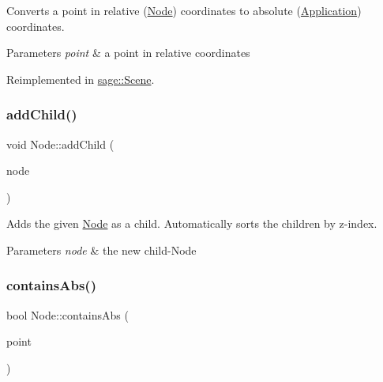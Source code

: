 Converts a point in relative (\mbox{\hyperlink{classsage_1_1Node}{Node}}) coordinates to absolute (\mbox{\hyperlink{classsage_1_1Application}{Application}}) coordinates. 


\begin{DoxyParams}{Parameters}
{\em point} & a point in relative coordinates \\
\hline
\end{DoxyParams}


Reimplemented in \mbox{\hyperlink{classsage_1_1Scene_a97d7d623cc44062249a199c63c67b5be}{sage\+::\+Scene}}.

\mbox{\label{classsage_1_1Node_ae7bf832d6fd80f69a244ae3dad7b3fb4}} 
\subsubsection{\texorpdfstring{addChild()}{addChild()}}
{\footnotesize\ttfamily void Node\+::add\+Child (\begin{DoxyParamCaption}\item[{\mbox{\hyperlink{classsage_1_1Node}{Node}} $\ast$}]{node }\end{DoxyParamCaption})}



Adds the given \mbox{\hyperlink{classsage_1_1Node}{Node}} as a child. Automatically sorts the children by z-\/index. 


\begin{DoxyParams}{Parameters}
{\em node} & the new child-\/\+Node \\
\hline
\end{DoxyParams}
\mbox{\label{classsage_1_1Node_a5ab70d0b3fc9a167175f7f864549db4d}} 
\subsubsection{\texorpdfstring{containsAbs()}{containsAbs()}}
{\footnotesize\ttfamily bool Node\+::contains\+Abs (\begin{DoxyParamCaption}\item[{glm\+::vec2}]{point }\end{DoxyParamCaption})}



